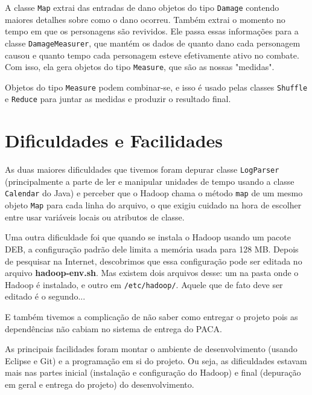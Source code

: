 \documentclass[a4paper,11pt]{article}
\begin{document}
  A classe \verb$Map$ extrai das entradas de dano objetos do tipo \verb$Damage$
  contendo maiores detalhes sobre como o dano ocorreu. Também extrai o momento
  no tempo em que os personagens são revividos. Ele passa essas informações para
  a classe \verb$DamageMeasurer$, que mantém os dados de quanto dano cada
  personagem causou e quanto tempo cada personagem esteve efetivamente ativo no
  combate. Com isso, ela gera objetos do tipo \verb$Measure$, que são as nossas
  "medidas".
  
  Objetos do tipo \verb$Measure$ podem combinar-se, e isso é usado pelas classes
  \verb$Shuffle$ e \verb$Reduce$ para juntar as medidas e produzir o resultado
  final.
  
\section{Dificuldades e Facilidades}

  As duas maiores dificuldades que tivemos foram depurar classe \verb$LogParser$
  (principalmente a parte de ler e manipular unidades de tempo usando a classe
  \verb$Calendar$ do Java) e perceber que o Hadoop chama o método \verb$map$ de
  um mesmo objeto \verb$Map$ para cada linha do arquivo, o que exigiu cuidado na
  hora de escolher entre usar variáveis locais ou atributos de classe.
  
  Uma outra dificuldade foi que quando se instala o Hadoop usando um pacote DEB,
  a configuração padrão dele limita a memória usada para 128 MB. Depois de
  pesquisar na Internet, descobrimos que essa configuração pode ser editada no
  arquivo \textbf{hadoop-env.sh}. Mas existem dois arquivos desse: um na pasta
  onde o Hadoop é instalado, e outro em \verb$/etc/hadoop/$. Aquele que de fato
  deve ser editado é o segundo...
  
  E também tivemos a complicação de não saber como entregar o projeto pois as
  dependências não cabiam no sistema de entrega do PACA.
  
  As principais facilidades foram montar o ambiente de desenvolvimento (usando
  Eclipse e Git) e a programação em si do projeto. Ou seja, as dificuldades
  estavam mais nas partes inicial (instalação e configuração do Hadoop) e final
  (depuração em geral e entrega do projeto) do desenvolvimento.
\end{document}
